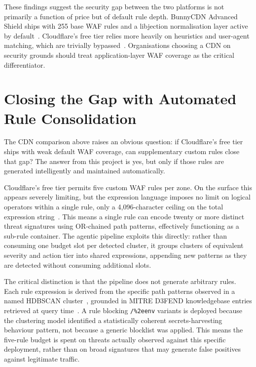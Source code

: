 \documentclass[12pt, a4paper]{report}   %
\begin{document}
These findings suggest the security gap between the two
platforms is not primarily a function of price but of default
rule depth. BunnyCDN Advanced Shield ships with 255 base WAF
rules and a libjection normalisation layer active by
default~\cite{bunny-waf-docs}. Cloudflare's free tier relies
more heavily on heuristics and user-agent matching, which are
trivially bypassed~\cite{cf-how-works}. Organisations choosing
a CDN on security grounds should treat application-layer WAF
coverage as the critical differentiator.

\section{Closing the Gap with Automated Rule Consolidation}
\label{sec:rule-consolidation}

The CDN comparison above raises an obvious question: if
Cloudflare's free tier ships with weak default WAF coverage,
can supplementary custom rules close that gap? The answer from
this project is yes, but only if those rules are generated
intelligently and maintained automatically.

Cloudflare's free tier permits five custom WAF rules per zone.
On the surface this appears severely limiting, but the
expression language imposes no limit on logical operators within
a single rule, only a 4,096-character ceiling on the total
expression string~\cite{cf-community-blocking}. This means a
single rule can encode twenty or more distinct threat signatures
using OR-chained path patterns, effectively functioning as a
sub-rule container. The agentic pipeline exploits this
directly: rather than consuming one budget slot per detected
cluster, it groups clusters of equivalent severity and action
tier into shared expressions, appending new patterns as they
are detected without consuming additional slots.

The critical distinction is that the pipeline does not generate
arbitrary rules. Each rule expression is derived from the
specific path patterns observed in a named HDBSCAN
cluster~\cite{sklearn-hdbscan}, grounded in MITRE D3FEND
knowledgebase entries retrieved at query time~\cite{d3fend}.
A rule blocking \texttt{/\%2eenv} variants is deployed because
the clustering model identified a statistically coherent
secrets-harvesting behaviour pattern, not because a generic
blocklist was applied. This means the five-rule budget is spent
on threats actually observed against this specific deployment,
rather than on broad signatures that may generate false
positives against legitimate traffic.
\end{document}
